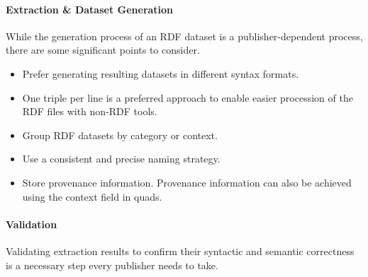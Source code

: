 \documentclass[a4paper,english,twoside,BCOR1.5cm,headsepline,DIV12,appendixprefix,final,12pt]{scrbook}
\def\emph{\textit}
\begin{document}
\vspace{-1.5em}
\paragraph{Extraction \& Dataset Generation}
While the generation process of an RDF dataset is a publisher-dependent process, there are some significant points to consider.

\begin{itemize}
\itemsep0em 
\item Prefer generating resulting datasets in different syntax formats. 
\item One triple per line is a preferred approach to enable easier procession of the RDF files with non-RDF tools.
\item Group RDF datasets by category or context.%
\item Use a consistent and precise naming strategy.%
\item Store provenance information. Provenance information can also be achieved using the context field in quads.%
\end{itemize}


\vspace{-1.5em}
\paragraph{Validation}
Validating extraction results to confirm their syntactic and semantic correctness is a necessary step every publisher needs to take.%
\end{document}

